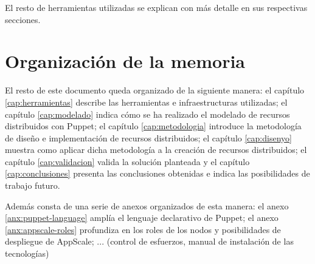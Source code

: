 El resto de herramientas utilizadas se explican con más detalle en sus respectivas secciones.


\section{Organización de la memoria}


El resto de este documento queda organizado de la siguiente manera: el capítulo \ref{cap:herramientas} describe las herramientas e infraestructuras utilizadas; el capítulo \ref{cap:modelado} indica cómo se ha realizado el modelado de recursos distribuidos con Puppet; el capítulo \ref{cap:metodologia} introduce la metodología de diseño e implementación de recursos distribuidos; el capítulo \ref{cap:disenyo} muestra como aplicar dicha metodología a la creación de recursos distribuidos; el capítulo \ref{cap:validacion} valida la solución planteada y el capítulo \ref{cap:conclusiones} presenta las conclusiones obtenidas e indica las posibilidades de trabajo futuro.


Además consta de una serie de anexos organizados de esta manera: el anexo \ref{anx:puppet-language} amplía el lenguaje declarativo de Puppet; el anexo \ref{anx:appscale-roles} profundiza en los roles de los nodos y posibilidades de despliegue de AppScale; ... (control de esfuerzos, manual de instalación de las tecnologías)

